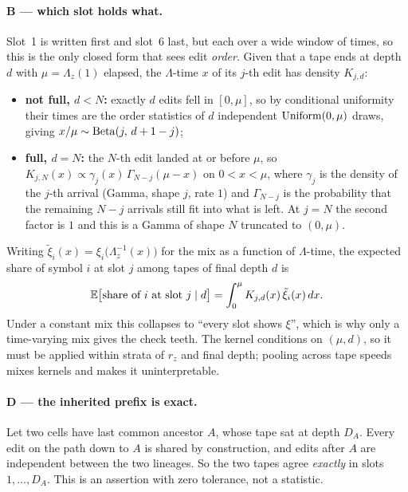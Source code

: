 \paragraph{B --- which slot holds what.} Slot~1 is written first and slot~6 last, but each over a wide
window of times, so this is the only closed form that sees edit \emph{order}. Given that a tape ends at
depth $d$ with $\mu=\Lambda_z(1)$ elapsed, the $\Lambda$-time $x$ of its $j$-th edit has density
$K_{j,d}$:
\begin{itemize}
  \item \textbf{not full, $d<N$:} exactly $d$ edits fell in $[0,\mu]$, so by conditional uniformity
        their times are the order statistics of $d$ independent $\operatorname{Uniform}(0,\mu)$ draws, giving
        $x/\mu\sim\operatorname{Beta}(j,\,d+1-j)$;
  \item \textbf{full, $d=N$:} the $N$-th edit landed at or before $\mu$, so
        $K_{j,N}(x)\propto \gamma_j(x)\,\Gamma_{N-j}(\mu-x)$ on $0<x<\mu$, where $\gamma_j$ is the
        density of the $j$-th arrival (Gamma, shape $j$, rate $1$) and $\Gamma_{N-j}$ is the
        probability that the remaining $N-j$ arrivals still fit into what is left. At $j=N$ the second
        factor is $1$ and this is a Gamma of shape $N$ truncated to $(0,\mu)$.
\end{itemize}
Writing $\tilde\xi_i(x)=\xi_i\big(\Lambda_z^{-1}(x)\big)$ for the mix as a function of $\Lambda$-time,
the expected share of symbol $i$ at slot $j$ among tapes of final depth $d$ is
\begin{equation}
  \mathbb{E}\big[\text{share of } i \text{ at slot } j \mid d\big]
  = \int_0^{\mu} K_{j,d}(x)\,\tilde\xi_i(x)\,dx .
  \label{eq:slotshare}
\end{equation}
Under a constant mix this collapses to ``every slot shows $\xi$'', which is why only a time-varying
mix gives the check teeth. The kernel conditions on $(\mu,d)$, so it must be applied within strata of
$r_z$ and final depth; pooling across tape speeds mixes kernels and makes it uninterpretable.

\paragraph{D --- the inherited prefix is exact.} Let two cells have last common ancestor $A$, whose
tape sat at depth $D_A$. Every edit on the path down to $A$ is shared by construction, and edits after
$A$ are independent between the two lineages. So the two tapes agree \emph{exactly} in slots
$1,\dots,D_A$. This is an assertion with zero tolerance, not a statistic.

